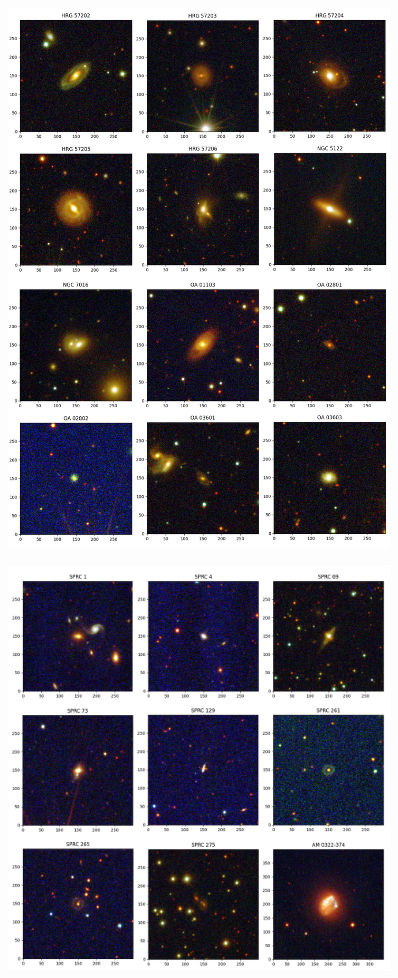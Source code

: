 \begin{anexosenv}
    \begin{figure}[h]
        \centering 
        \includegraphics[width=0.9\textwidth]{Imagens/imagem_09.png} 
        \caption[]{}
        \label{fig:imagem_09} 
    \end{figure}

    \begin{figure}[h]
        \centering
        \includegraphics[width=0.9\textwidth]{Imagens/imagem_10.png} 
        \caption[]{}
        \label{fig:imagem_10} 
    \end{figure}


\end{anexosenv}
